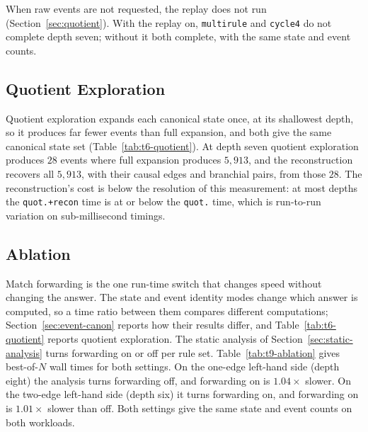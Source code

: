 When raw events are not requested, the replay does not run (Section~\ref{sec:quotient}). With the
replay on, \texttt{multirule} and \texttt{cycle4} do not complete depth seven; without it both
complete, with the same state and event counts.

\begin{table}[htbp]
\centering
\caption{\textbf{Resident-kernel occupancy, throughput and active lanes across the corpus},
from hardware counters under NVIDIA Nsight Compute: means over the profiled launches of the
resident kernel. Durations are the profiler's, which serializes execution and fixes clocks, and
are not comparable with the wall times of Table~\ref{tab:t7b-gpu-corpus}.}
\label{tab:device-occupancy}
\resizebox{\ifdim\width>\linewidth\linewidth\else\width\fi}{!}{%
}
\end{table}

\subsection{Quotient Exploration}
Quotient exploration expands each canonical state once, at its shallowest depth, so it produces far
fewer events than full expansion, and both give the same canonical state set
(Table~\ref{tab:t6-quotient}). At depth seven quotient exploration produces $28$ events where full
expansion produces $5{,}913$, and the reconstruction recovers all $5{,}913$, with their causal
edges and branchial pairs, from those $28$. The reconstruction's cost is below the resolution of
this measurement: at most depths the \texttt{quot.+recon} time is at or below the \texttt{quot.}
time, which is run-to-run variation on sub-millisecond timings.

\begin{table}[htbp]
\centering
\caption{Events and wall time, quotient exploration against full expansion, by depth on the
Wolfram rule; at every depth the reconstruction gives full expansion's event and causal counts
exactly.}
\label{tab:t6-quotient}

\end{table}

\subsection{Ablation}
Match forwarding is the one run-time switch that changes speed without changing the answer. The
state and event identity modes change which answer is computed, so a time ratio between them
compares different computations; Section~\ref{sec:event-canon} reports how their results differ,
and Table~\ref{tab:t6-quotient} reports quotient exploration. The static analysis of
Section~\ref{sec:static-analysis} turns forwarding on or off per rule set. Table~\ref{tab:t9-ablation}
gives best-of-$N$ wall times for both settings. On the one-edge left-hand side (depth eight) the
analysis turns forwarding off, and forwarding on is $1.04\times$ slower. On the two-edge left-hand
side (depth six) it turns forwarding on, and forwarding on is $1.01\times$ slower than off. Both settings give
the same state and event counts on both workloads.

